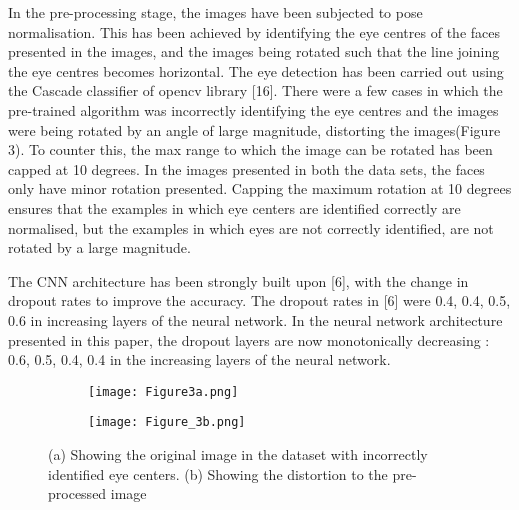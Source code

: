 \documentclass[letterpaper,10pt]{article}
\begin{document}
In the pre-processing stage, the images have been subjected to pose normalisation. This has been achieved by identifying the eye centres of the faces presented in the images, and the images being rotated such that the line joining the eye centres becomes horizontal. The eye detection has been carried out using the Cascade classifier of opencv library [16]. There were a few cases in which the pre-trained algorithm was incorrectly identifying the eye centres and the images were being rotated by an angle of large magnitude, distorting the images(Figure 3). To counter this, the max range to which the image can be rotated has been capped at 10 degrees. In the images presented in both the data sets, the faces only have minor rotation presented. Capping the maximum rotation at 10 degrees ensures that the examples in which eye centers are identified correctly are normalised, but the examples in which eyes are not correctly identified, are not rotated by a large magnitude.

The CNN architecture has been strongly built upon [6], with the change in dropout rates to improve the accuracy.
The dropout rates in [6] were 0.4, 0.4, 0.5, 0.6 in increasing layers of  the neural network. In the neural network architecture presented in this paper, the dropout layers are now monotonically decreasing : 0.6, 0.5, 0.4, 0.4 in the increasing layers of the neural network.
\begin{figure}
     \centering
     \begin{subfigure}[b]{0.3\textwidth}
         \centering
         \texttt{[image: Figure3a.png]}
         
         \caption{}
     \end{subfigure}
     \begin{subfigure}[b]{0.3\textwidth}
         \centering
         \texttt{[image: Figure\_3b.png]}
       \caption{}
     \end{subfigure}
        \caption{(a) Showing the original image in the dataset with incorrectly identified eye centers. (b) Showing the distortion to the pre-processed image
}
        
\end{figure}
\end{document}
